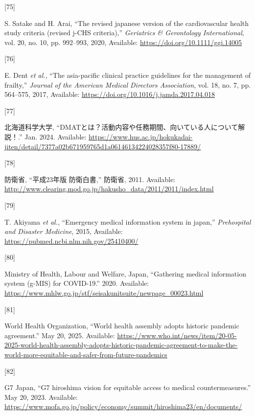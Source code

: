 \documentclass[
  a4paper,
  a4paper,
  11pt]{ltjsbook}
\newlength{\cslhangindent}
\newlength{\csllabelwidth}
\newenvironment{CSLReferences}[2] %
 {\begin{list}{}{%
  \setlength{\itemindent}{0pt}
  \setlength{\leftmargin}{0pt}
  \setlength{\parsep}{0pt}
  \ifodd #1
   \setlength{\leftmargin}{\cslhangindent}
   \setlength{\itemindent}{-1\cslhangindent}
  \fi
  \setlength{\itemsep}{#2\baselineskip}}}
 {\end{list}}
\newcommand{\CSLLeftMargin}[1]{\parbox[t]{\csllabelwidth}{\strut#1\strut}}
\newcommand{\CSLRightInline}[1]{\parbox[t]{\linewidth - \csllabelwidth}{\strut#1\strut}}
\begin{document}
\begin{CSLReferences}{0}{0}
\CSLLeftMargin{{[}75{]} }%
\CSLRightInline{S. Satake and H. Arai, {``The revised japanese version
of the cardiovascular health study criteria (revised j-CHS criteria),''}
\emph{Geriatrics \& Gerontology International}, vol. 20, no. 10, pp.
992--993, 2020, Available: \url{https://doi.org/10.1111/ggi.14005}}

\CSLLeftMargin{{[}76{]} }%
\CSLRightInline{E. Dent \emph{et al.}, {``The asia-pacific clinical
practice guidelines for the management of frailty,''} \emph{Journal of
the American Medical Directors Association}, vol. 18, no. 7, pp.
564--575, 2017, Available:
\url{https://doi.org/10.1016/j.jamda.2017.04.018}}

\CSLLeftMargin{{[}77{]} }%
\CSLRightInline{北海道科学大学,
{``DMATとは？活動内容や任務期間、向いている人について解説！.''} Jan.
2024. Available:
\url{https://www.hus.ac.jp/hokukadai-jiten/detail/7377a02b671959765d1a06146134224028357f80-17889/}}

\CSLLeftMargin{{[}78{]} }%
\CSLRightInline{防衛省, {``平成23年版 防衛白書,''} 防衛省, 2011.
Available:
\url{http://www.clearing.mod.go.jp/hakusho_data/2011/2011/index.html}}

\CSLLeftMargin{{[}79{]} }%
\CSLRightInline{T. Akiyama \emph{et al.}, {``Emergency medical
information system in japan,''} \emph{Prehospital and Disaster
Medicine}, 2015, Available:
\url{https://pubmed.ncbi.nlm.nih.gov/25410400/}}

\CSLLeftMargin{{[}80{]} }%
\CSLRightInline{Ministry of Health, Labour and Welfare, Japan,
{``Gathering medical information system (g-MIS) for COVID-19.''} 2020.
Available:
\url{https://www.mhlw.go.jp/stf/seisakunitsuite/newpage_00023.html}}

\CSLLeftMargin{{[}81{]} }%
\CSLRightInline{World Health Organization, {``World health assembly
adopts historic pandemic agreement.''} May 20, 2025. Available:
\url{https://www.who.int/news/item/20-05-2025-world-health-assembly-adopts-historic-pandemic-agreement-to-make-the-world-more-equitable-and-safer-from-future-pandemics}}

\CSLLeftMargin{{[}82{]} }%
\CSLRightInline{G7 Japan, {``G7 hiroshima vision for equitable access to
medical countermeasures.''} May 20, 2023. Available:
\url{https://www.mofa.go.jp/policy/economy/summit/hiroshima23/en/documents/}}


\end{CSLReferences}
\end{document}

